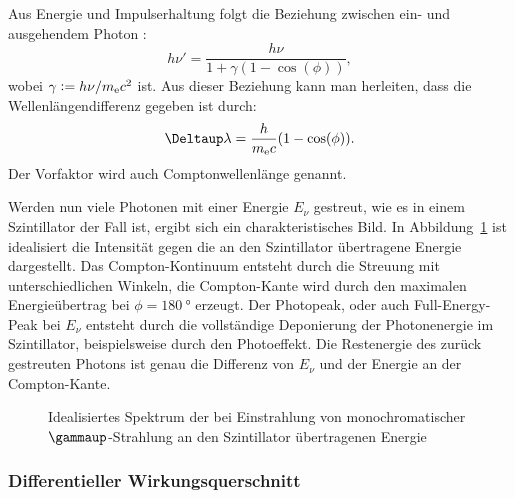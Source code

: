 \documentclass[11pt, ngerman, fleqn, DIV=15, headinclude, BCOR=2cm]{scrreprt}
\begin{document}
Aus Energie und Impulserhaltung folgt die Beziehung zwischen ein- und
ausgehendem Photon \parencite[(2.106)]{Leo/Techniques_Nuclear_Experiments}:
\begin{equation}
    \label{eq:h_nu_prime}
    h\nu' = \frac{h\nu}{1 + \gamma(1 - \cos(\phi))},
\end{equation}
wobei $\gamma := h \nu / m_\text e c^2$ ist. Aus dieser Beziehung kann man
herleiten, dass die Wellenlängendifferenz gegeben ist durch:
\[
    \Deltaup \lambda = \frac{h}{m_\text e c} (1 - \cos(\phi)).
\]
Der Vorfaktor wird auch Comptonwellenlänge genannt.

Werden nun viele Photonen mit einer Energie $E_\nu$ gestreut, wie es in einem
Szintillator der Fall ist, ergibt sich ein charakteristisches Bild. In
Abbildung~\ref{fig:Compton} ist idealisiert die Intensität gegen die an den
Szintillator übertragene Energie dargestellt. Das Compton-Kontinuum entsteht
durch die Streuung mit unterschiedlichen Winkeln, die Compton-Kante wird durch
den maximalen Energieübertrag bei $\phi = \SI{180}{\degree}$ erzeugt. Der
Photopeak, oder auch Full-Energy-Peak bei $E_\nu$ entsteht durch die
vollständige Deponierung der Photonenergie im Szintillator, beispielsweise
durch den Photoeffekt. Die Restenergie des zurück gestreuten Photons ist genau
die Differenz von $E_\nu$ und der Energie an der Compton-Kante.

\begin{figure}[htbp]
    \centering
    \caption{%
        Idealisiertes Spektrum der bei Einstrahlung von monochromatischer
        $\gammaup$-Strahlung an den Szintillator übertragenen Energie
    }
    \label{fig:Compton}
\end{figure}

\subsubsection{Differentieller Wirkungsquerschnitt}
\end{document}
